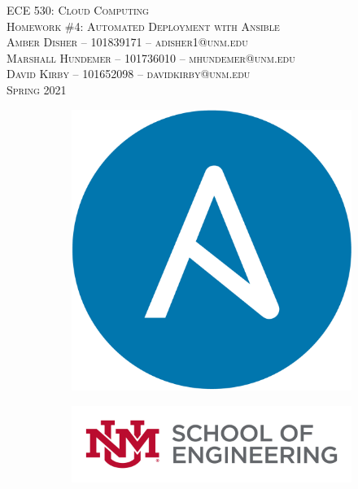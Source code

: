 \documentclass{article}
\begin{document}
\setmainfont{SF Pro Text}
\setsansfont{SF Pro Text}
\setmonofont{SF Mono}
\renewcommand{\familydefault}{\sfdefault}

\thispagestyle{empty}
\begin{titlepage}
\vspace*{\fill}
\begin{center}
\textsc{\Huge{ECE 530: Cloud Computing}}\\[3em]
\textsc{\LARGE Homework \#4: Automated Deployment with Ansible}\\[6em]
\textsc{\Large\hspace{2em} Amber Disher -- 101839171 -- adisher1@unm.edu\\[0.8em]
Marshall Hundemer -- 101736010 -- mhundemer@unm.edu\\[1em]
\hspace{3.5em} David Kirby -- 101652098 -- davidkirby@unm.edu}\\[3em]
\textsc{\Large Spring 2021}
\end{center}
\vfill
\begin{figure}[h]
\begin{subfigure}{0.5\textwidth}
\includegraphics[width=0.3\linewidth]{Ansible-logo.png}
\end{subfigure}
\begin{subfigure}{0.6\textwidth}\hspace{1em}
\includegraphics[width=0.8\linewidth]{new-soe-logo.png}
\end{subfigure}
\end{figure}
\end{titlepage}
\setcounter{figure}{0}

\tableofcontents

\listoffigures
\newpage
\setcounter{section}{+1}
\end{document}
